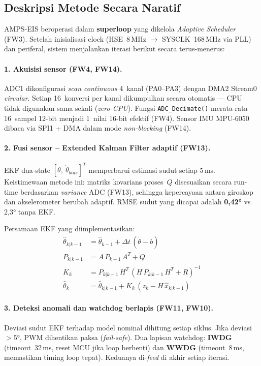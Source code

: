 \documentclass[12pt,a4paper]{article}
\begin{document}
\subsection{Deskripsi Metode Secara Naratif}

AMPS-EIS beroperasi dalam \textbf{superloop} yang dikelola
\textit{Adaptive Scheduler} (FW3). Setelah inisialisasi clock
(HSE~8\,MHz $\to$ SYSCLK~168\,MHz via PLL) dan periferal, sistem
menjalankan iterasi berikut secara terus-menerus:

\paragraph{1. Akuisisi sensor (FW4, FW14).}
ADC1 dikonfigurasi \textit{scan continuous} 4~kanal (PA0--PA3) dengan
DMA2 Stream0 \textit{circular}. Setiap 16~konversi per kanal
dikumpulkan secara otomatis --- CPU tidak digunakan sama sekali
(\textit{zero-CPU}). Fungsi \texttt{ADC\_Decimate()} merata-rata 16~sampel
12-bit menjadi 1~nilai 16-bit efektif (FW4). Sensor IMU MPU-6050
dibaca via SPI1 + DMA dalam mode \textit{non-blocking} (FW14).

\paragraph{2. Fusi sensor -- Extended Kalman Filter adaptif (FW13).}
EKF dua-state $[\theta,\ \dot\theta_{bias}]^T$ memperbarui estimasi
sudut setiap 5\,ms. Keistimewaan metode ini: matriks kovarians proses~$Q$
disesuaikan secara run-time berdasarkan \textit{variance} ADC (FW13),
sehingga kepercayaan antara giroskop dan akselerometer berubah adaptif.
RMSE sudut yang dicapai adalah \textbf{0,42°} vs 2,3° tanpa EKF.

Persamaan EKF yang diimplementasikan:
\begin{align}
\hat\theta_{k|k-1} &= \hat\theta_{k-1} + \Delta t\,(\dot\theta - b)\\
P_{k|k-1} &= A\,P_{k-1}\,A^T + Q\\
K_k &= P_{k|k-1}\,H^T\,(H\,P_{k|k-1}\,H^T + R)^{-1}\\
\hat\theta_k &= \hat\theta_{k|k-1} + K_k\,(z_k - H\,\hat x_{k|k-1})
\end{align}

\paragraph{3. Deteksi anomali dan watchdog berlapis (FW11, FW10).}
Deviasi sudut EKF terhadap model nominal dihitung setiap siklus.
Jika deviasi $>5°$, PWM dihentikan paksa (\textit{fail-safe}).
Dua lapisan watchdog: \textbf{IWDG} (timeout~32\,ms, reset MCU jika
loop berhenti) dan \textbf{WWDG} (timeout~8\,ms, memastikan timing
loop tepat). Keduanya di-\textit{feed} di akhir setiap iterasi.
\end{document}
